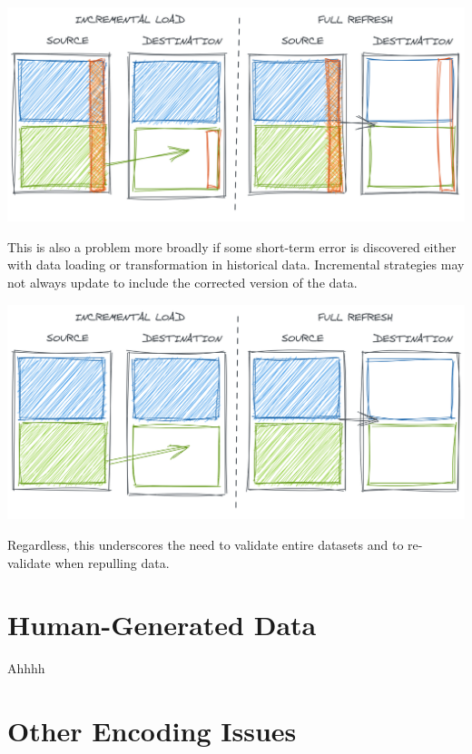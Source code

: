 \documentclass[
]{krantz}
\begin{document}
\begin{center}\includegraphics[width=0.9\linewidth]{figures/data-dall/incr-full-bad-col} \end{center}

This is also a problem more broadly if some short-term error is discovered either with data loading or transformation in historical data. Incremental strategies may not always update to include the corrected version of the data.

\begin{center}\includegraphics[width=0.9\linewidth]{figures/data-dall/incr-full-good} \end{center}

Regardless, this underscores the need to validate entire datasets and to re-validate when repulling data.

\hypertarget{human-generated-data}{%
\section{Human-Generated Data}\label{human-generated-data}}

Ahhhh

\hypertarget{other-encoding-issues}{%
\section{Other Encoding Issues}\label{other-encoding-issues}}
\end{document}

